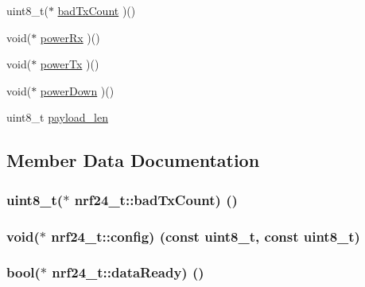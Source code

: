 \begin{DoxyCompactItemize}
\item 
uint8\+\_\+t($\ast$ \hyperlink{structnrf24__t_a68c5c9c097c40be2e4058519386be051}{bad\+Tx\+Count} )()
\item 
void($\ast$ \hyperlink{structnrf24__t_ab25e37a1480a77544d05e50d395388cb}{power\+Rx} )()
\item 
void($\ast$ \hyperlink{structnrf24__t_a92ed761e9c215786b80685a915ce87d7}{power\+Tx} )()
\item 
void($\ast$ \hyperlink{structnrf24__t_aead930e67d5d5eb04822cb4ae990685d}{power\+Down} )()
\item 
uint8\+\_\+t \hyperlink{structnrf24__t_a169e5d060ccd36a6387c15bb49daf09f}{payload\+\_\+len}
\end{DoxyCompactItemize}


\subsection{Member Data Documentation}
\hypertarget{structnrf24__t_a68c5c9c097c40be2e4058519386be051}{}
\subsubsection[{bad\+Tx\+Count}]{\setlength{\rightskip}{0pt plus 5cm}uint8\+\_\+t($\ast$ nrf24\+\_\+t\+::bad\+Tx\+Count) ()}\label{structnrf24__t_a68c5c9c097c40be2e4058519386be051}
\hypertarget{structnrf24__t_a84a2a68d2e139d5d1f12b26f1883f401}{}
\subsubsection[{config}]{\setlength{\rightskip}{0pt plus 5cm}void($\ast$ nrf24\+\_\+t\+::config) (const uint8\+\_\+t, const uint8\+\_\+t)}\label{structnrf24__t_a84a2a68d2e139d5d1f12b26f1883f401}
\hypertarget{structnrf24__t_ae3ba9b440dc852e8ef9ddc43304f3228}{}
\subsubsection[{data\+Ready}]{\setlength{\rightskip}{0pt plus 5cm}bool($\ast$ nrf24\+\_\+t\+::data\+Ready) ()}\label{structnrf24__t_ae3ba9b440dc852e8ef9ddc43304f3228}
\hypertarget{structnrf24__t_ad0896af4e3e40a15bd991aec48769cd4}{}
